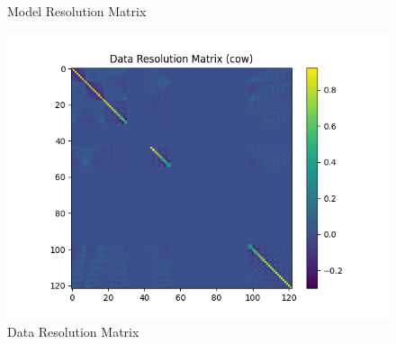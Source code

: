 \documentclass{article}
\begin{document}
\begin{itemize}
\begin{figure}[h]
    \caption{Model Resolution Matrix}
\end{figure}
\begin{figure}[h]
    \centering
    \includegraphics[width=1\textwidth]{images/outputs/datares/cow.png}
    \caption{Data Resolution Matrix}
\end{figure}
\clearpage



\end{itemize}
\end{document}
